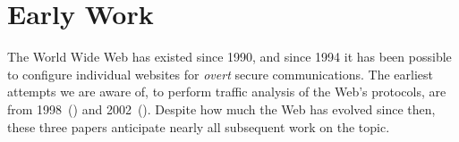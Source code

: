 \documentclass{zarticle}
\def\todo#1{{\color{todocolor}\bfseries [#1]}}
\begin{document}
\section{Early Work}

The World Wide Web has existed since 1990, and since 1994 it has been
possible to configure individual websites for \emph{overt} secure
communications.  The earliest attempts we are aware of, to perform
traffic analysis of the Web's protocols, are from
1998~(\textcite{cheng1998traffic}) and
2002~(\textcite{hintz2002fingerprinting,sun2002statistical}).  Despite
how much the Web has evolved since then, these three papers anticipate
nearly all subsequent work on the topic.  








\end{document}
